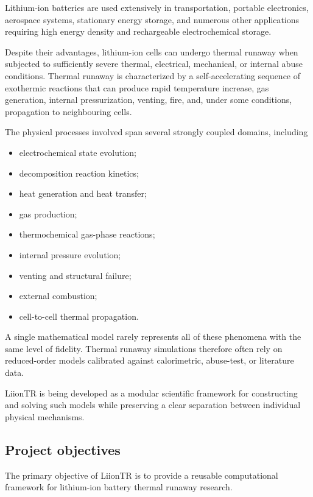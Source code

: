 Lithium-ion batteries are used extensively in transportation, portable
electronics, aerospace systems, stationary energy storage, and numerous
other applications requiring high energy density and rechargeable
electrochemical storage.

Despite their advantages, lithium-ion cells can undergo thermal runaway
when subjected to sufficiently severe thermal, electrical, mechanical,
or internal abuse conditions. Thermal runaway is characterized by a
self-accelerating sequence of exothermic reactions that can produce rapid
temperature increase, gas generation, internal pressurization, venting,
fire, and, under some conditions, propagation to neighbouring cells.

The physical processes involved span several strongly coupled domains,
including

\begin{itemize}
    \item electrochemical state evolution;
    \item decomposition reaction kinetics;
    \item heat generation and heat transfer;
    \item gas production;
    \item thermochemical gas-phase reactions;
    \item internal pressure evolution;
    \item venting and structural failure;
    \item external combustion;
    \item cell-to-cell thermal propagation.
\end{itemize}

A single mathematical model rarely represents all of these phenomena
with the same level of fidelity. Thermal runaway simulations therefore
often rely on reduced-order models calibrated against calorimetric,
abuse-test, or literature data.

LiionTR is being developed as a modular scientific framework for
constructing and solving such models while preserving a clear separation
between individual physical mechanisms.


\subsection{Project objectives}

The primary objective of LiionTR is to provide a reusable computational
framework for lithium-ion battery thermal runaway research.

